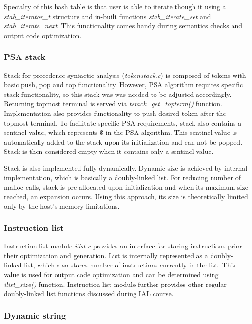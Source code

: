 \documentclass[a4paper, 11pt]{article}
\begin{document}
Specialty of this hash table is that user is able to iterate though it using a \emph{stab\_iterator\_t} structure and in-built functions \emph{stab\_iterate\_set} and \emph{stab\_iterate\_next}. This functionality comes handy during semantics checks and output code optimization.

\subsubsection{PSA stack}

Stack for precedence syntactic analysis (\emph{tokenstack.c}) is composed of tokens with basic push, pop and top functionality. However, PSA algorithm requires specific stack functionality, so this stack was was needed to be adjusted accordingly. Returning topmost terminal is served via \emph{tstack\_get\_topterm()} function. Implementation also provides functionality to push desired token after the topmost terminal. To facilitate specific PSA requirements, stack also contains a sentinel value, which represents $\$$ in the PSA algorithm. This sentinel value is automatically added to the stack upon its initialization and can not be popped. Stack is then considered empty when it contains only a sentinel value.

Stack is also implemented fully dynamically. Dynamic size is achieved by internal implementation, which is basically a doubly-linked list. For reducing number of malloc calls, stack is pre-allocated upon initialization and when its maximum size reached, an expansion occurs. Using this approach, its size is theoretically limited only by the host's memory limitations.

\subsubsection{Instruction list}

Instruction list module \emph{ilist.c} provides an interface for storing instructions prior their optimization and generation. List is internally represented as a doubly-linked list, which also stores number of instructions currently in the list. This value is used for output code optimization and can be determined using \emph{ilist\_size()} function. Instruction list module further provides other regular doubly-linked list functions discussed during IAL course.

\subsubsection{Dynamic string}
\end{document}
